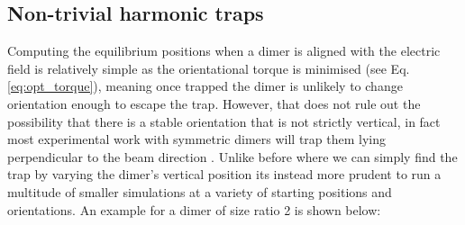 \subsection{Non-trivial harmonic traps}\label{sec:off-axis}
Computing the equilibrium positions when a dimer is aligned with the electric field is relatively simple as the orientational torque is minimised (see Eq.\ref{eq:opt_torque}), meaning once trapped the dimer is unlikely to change orientation enough to escape the trap. However, that does not rule out the possibility that there is a stable orientation that is not strictly vertical, in fact most experimental work with symmetric dimers will trap them lying perpendicular to the beam direction \cite{Ahn2018}. Unlike before where we can simply find the trap by varying the dimer's vertical position its instead more prudent to run a multitude of smaller simulations at a variety of starting positions and orientations. An example for a dimer of size ratio 2 is shown below:
